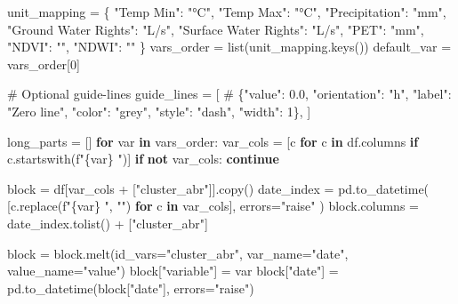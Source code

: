 \documentclass[
  letterpaper,
  DIV=11,
  numbers=noendperiod]{scrreprt}
\newenvironment{Shaded}{\begin{snugshade}}{\end{snugshade}}
\newcommand{\BuiltInTok}[1]{\textcolor[rgb]{0.00,0.23,0.31}{#1}}
\newcommand{\CommentTok}[1]{\textcolor[rgb]{0.37,0.37,0.37}{#1}}
\newcommand{\ControlFlowTok}[1]{\textcolor[rgb]{0.00,0.23,0.31}{\textbf{#1}}}
\newcommand{\DecValTok}[1]{\textcolor[rgb]{0.68,0.00,0.00}{#1}}
\newcommand{\KeywordTok}[1]{\textcolor[rgb]{0.00,0.23,0.31}{\textbf{#1}}}
\newcommand{\NormalTok}[1]{\textcolor[rgb]{0.00,0.23,0.31}{#1}}
\newcommand{\OperatorTok}[1]{\textcolor[rgb]{0.37,0.37,0.37}{#1}}
\newcommand{\SpecialCharTok}[1]{\textcolor[rgb]{0.37,0.37,0.37}{#1}}
\newcommand{\SpecialStringTok}[1]{\textcolor[rgb]{0.13,0.47,0.30}{#1}}
\newcommand{\StringTok}[1]{\textcolor[rgb]{0.13,0.47,0.30}{#1}}
\begin{document}
\begin{Shaded}
\begin{Highlighting}[]
\NormalTok{unit\_mapping }\OperatorTok{=}\NormalTok{ \{}
    \StringTok{"Temp Min"}\NormalTok{: }\StringTok{"°C"}\NormalTok{, }
    \StringTok{"Temp Max"}\NormalTok{: }\StringTok{"°C"}\NormalTok{, }
    \StringTok{"Precipitation"}\NormalTok{: }\StringTok{"mm"}\NormalTok{, }
    \StringTok{"Ground Water Rights"}\NormalTok{: }\StringTok{"L/s"}\NormalTok{, }
    \StringTok{"Surface Water Rights"}\NormalTok{: }\StringTok{"L/s"}\NormalTok{, }
    \StringTok{"PET"}\NormalTok{: }\StringTok{"mm"}\NormalTok{, }
    \StringTok{"NDVI"}\NormalTok{: }\StringTok{""}\NormalTok{, }
    \StringTok{"NDWI"}\NormalTok{: }\StringTok{""}
\NormalTok{\}}
\NormalTok{vars\_order }\OperatorTok{=} \BuiltInTok{list}\NormalTok{(unit\_mapping.keys())}
\NormalTok{default\_var }\OperatorTok{=}\NormalTok{ vars\_order[}\DecValTok{0}\NormalTok{]}

\CommentTok{\# Optional guide{-}lines}
\NormalTok{guide\_lines }\OperatorTok{=}\NormalTok{ [}
    \CommentTok{\# \{"value": 0.0, "orientation": "h", "label": "Zero line", "color": "grey", "style": "dash", "width": 1\},}
\NormalTok{]}

\NormalTok{long\_parts }\OperatorTok{=}\NormalTok{ []}
\ControlFlowTok{for}\NormalTok{ var }\KeywordTok{in}\NormalTok{ vars\_order:}
\NormalTok{    var\_cols }\OperatorTok{=}\NormalTok{ [c }\ControlFlowTok{for}\NormalTok{ c }\KeywordTok{in}\NormalTok{ df.columns }\ControlFlowTok{if}\NormalTok{ c.startswith(}\SpecialStringTok{f"}\SpecialCharTok{\{}\NormalTok{var}\SpecialCharTok{\}}\SpecialStringTok{ "}\NormalTok{)]}
    \ControlFlowTok{if} \KeywordTok{not}\NormalTok{ var\_cols:}
        \ControlFlowTok{continue}

\NormalTok{    block }\OperatorTok{=}\NormalTok{ df[var\_cols }\OperatorTok{+}\NormalTok{ [}\StringTok{"cluster\_abr"}\NormalTok{]].copy()}
\NormalTok{    date\_index }\OperatorTok{=}\NormalTok{ pd.to\_datetime(}
\NormalTok{        [c.replace(}\SpecialStringTok{f"}\SpecialCharTok{\{}\NormalTok{var}\SpecialCharTok{\}}\SpecialStringTok{ "}\NormalTok{, }\StringTok{""}\NormalTok{) }\ControlFlowTok{for}\NormalTok{ c }\KeywordTok{in}\NormalTok{ var\_cols], errors}\OperatorTok{=}\StringTok{"raise"}
\NormalTok{    )}
\NormalTok{    block.columns }\OperatorTok{=}\NormalTok{ date\_index.tolist() }\OperatorTok{+}\NormalTok{ [}\StringTok{"cluster\_abr"}\NormalTok{]}

\NormalTok{    block }\OperatorTok{=}\NormalTok{ block.melt(id\_vars}\OperatorTok{=}\StringTok{"cluster\_abr"}\NormalTok{, var\_name}\OperatorTok{=}\StringTok{"date"}\NormalTok{, value\_name}\OperatorTok{=}\StringTok{"value"}\NormalTok{)}
\NormalTok{    block[}\StringTok{"variable"}\NormalTok{] }\OperatorTok{=}\NormalTok{ var}
\NormalTok{    block[}\StringTok{"date"}\NormalTok{] }\OperatorTok{=}\NormalTok{ pd.to\_datetime(block[}\StringTok{"date"}\NormalTok{], errors}\OperatorTok{=}\StringTok{"raise"}\NormalTok{)}


\end{Highlighting}
\end{Shaded}
\end{document}
